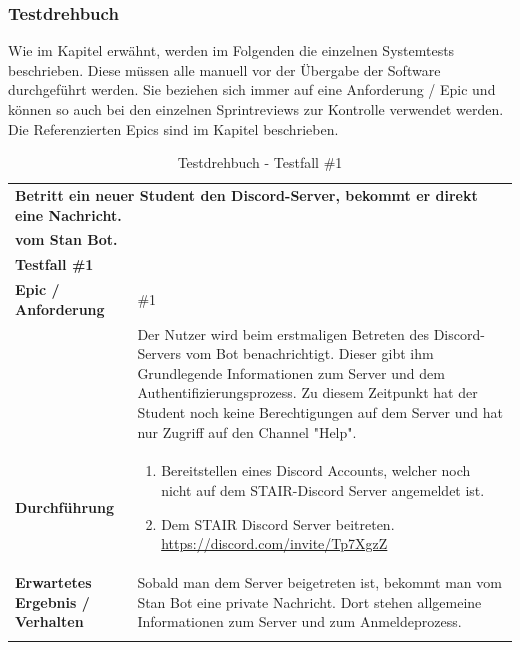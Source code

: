 \documentclass[a4paper, table]{article}
\begin{document}
\subsubsection{Testdrehbuch}\label{Testdrehbuch}
Wie im Kapitel  erwähnt, werden im Folgenden die einzelnen Systemtests beschrieben.
Diese müssen alle manuell vor der Übergabe der Software durchgeführt werden.
\newline
Sie beziehen sich immer auf eine Anforderung / Epic und können so auch bei den einzelnen Sprintreviews zur Kontrolle verwendet werden.
Die Referenzierten Epics sind im Kapitel  beschrieben.

\begin{longtable}[ht]{|p{15em}|p{25em}|}
    \hline
    \multicolumn{2}{|l|}{\textbf{Betritt ein neuer Student den Discord-Server, bekommt er direkt eine Nachricht.}} \\*
    \multicolumn{2}{|l|}{\textbf{vom Stan Bot.}} \\
    \hline
    \multicolumn{2}{|l|}{\textbf{Testfall \#1}} \\
    \hline
    \textbf{Epic / Anforderung} & \#1 \\
     & Der Nutzer wird beim erstmaligen Betreten des Discord-Servers vom Bot benachrichtigt.
     Dieser gibt ihm Grundlegende Informationen zum Server und dem Authentifizierungsprozess.
     Zu diesem Zeitpunkt hat der Student noch keine Berechtigungen auf dem Server und
     hat nur Zugriff auf den Channel "Help". \\
    \hline
    \textbf{Durchführung} &
    \begin{enumerate}
        \item Bereitstellen eines Discord Accounts, welcher noch nicht auf dem STAIR-Discord Server angemeldet ist.
        \item Dem STAIR Discord Server beitreten. \url{https://discord.com/invite/Tp7XgzZ}
    \end{enumerate}\\
    \hline
    \textbf{Erwartetes Ergebnis / Verhalten} & Sobald man dem Server beigetreten ist, bekommt man vom Stan Bot eine private Nachricht.
    Dort stehen allgemeine Informationen zum Server und zum Anmeldeprozess. \\
    \hline
    \caption{Testdrehbuch - Testfall \#1}
\end{longtable}
\end{document}
